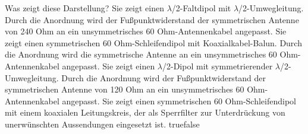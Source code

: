     {Was zeigt diese Darstellung?}
    {Sie zeigt einen $\lambda$/2-Faltdipol mit $\lambda$/2-Umwegleitung. Durch die Anordnung wird der Fußpunktwiderstand der symmetrischen Antenne von 240 Ohm an ein unsymmetrisches 60 Ohm-Antennenkabel angepasst.}
    {Sie zeigt einen symmetrischen 60 Ohm-Schleifendipol mit Koaxialkabel-Balun. Durch die Anordnung wird die symmetrische Antenne an ein unsymmetrisches 60 Ohm-Antennenkabel angepasst.}
    {Sie zeigt einen $\lambda$/2-Dipol mit symmetrierender $\lambda$/2-Umwegleitung. Durch die Anordnung wird der Fußpunktwiderstand der symmetrischen Antenne von 120 Ohm an ein unsymmetrisches 60 Ohm-Antennenkabel angepasst.}
    {Sie zeigt einen symmetrischen 60 Ohm-Schleifendipol mit einem koaxialen Leitungskreis, der als Sperrfilter zur Unterdrückung von unerwünschten Aussendungen eingesetzt ist.}
    {true}{false}